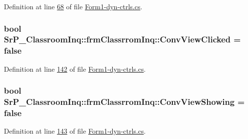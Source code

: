 \-Definition at line \hyperlink{_form1-dyn-ctrls_8cs_source_l00068}{68} of file \hyperlink{_form1-dyn-ctrls_8cs_source}{\-Form1-\/dyn-\/ctrls.\-cs}.

\hypertarget{class_sr_p___classroom_inq_1_1frm_classrrom_inq_a567cf412a542927bb47984c0e835a7d2}{
\subsubsection[{\-Conv\-View\-Clicked}]{\setlength{\rightskip}{0pt plus 5cm}bool {\bf \-Sr\-P\-\_\-\-Classroom\-Inq\-::frm\-Classrrom\-Inq\-::\-Conv\-View\-Clicked} = false}}
\label{class_sr_p___classroom_inq_1_1frm_classrrom_inq_a567cf412a542927bb47984c0e835a7d2}


\-Definition at line \hyperlink{_form1-dyn-ctrls_8cs_source_l00142}{142} of file \hyperlink{_form1-dyn-ctrls_8cs_source}{\-Form1-\/dyn-\/ctrls.\-cs}.

\hypertarget{class_sr_p___classroom_inq_1_1frm_classrrom_inq_a5b2fbbaa361339e096aa4be3f8e2b2dd}{
\subsubsection[{\-Conv\-View\-Showing}]{\setlength{\rightskip}{0pt plus 5cm}bool {\bf \-Sr\-P\-\_\-\-Classroom\-Inq\-::frm\-Classrrom\-Inq\-::\-Conv\-View\-Showing} = false}}
\label{class_sr_p___classroom_inq_1_1frm_classrrom_inq_a5b2fbbaa361339e096aa4be3f8e2b2dd}


\-Definition at line \hyperlink{_form1-dyn-ctrls_8cs_source_l00143}{143} of file \hyperlink{_form1-dyn-ctrls_8cs_source}{\-Form1-\/dyn-\/ctrls.\-cs}.

